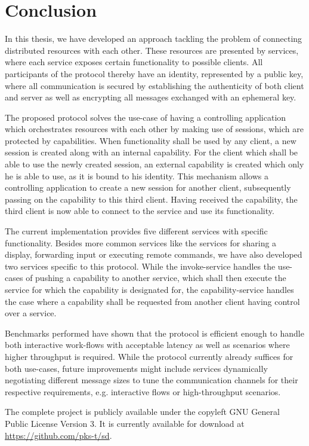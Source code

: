 \section{Conclusion}

In this thesis, we have developed an approach tackling the problem of connecting distributed resources with each other.
These resources are presented by services, where each service exposes certain functionality to possible clients.
All participants of the protocol thereby have an identity, represented by a public key, where all communication is secured by establishing the authenticity of both client and server as well as encrypting all messages exchanged with an ephemeral key.

The proposed protocol solves the use-case of having a controlling application which orchestrates resources with each other by making use of sessions, which are protected by capabilities.
When functionality shall be used by any client, a new session is created along with an internal capability.
For the client which shall be able to use the newly created session, an external capability is created which only he is able to use, as it is bound to his identity.
This mechanism allows a controlling application to create a new session for another client, subsequently passing on the capability to this third client.
Having received the capability, the third client is now able to connect to the service and use its functionality.

The current implementation provides five different services with specific functionality.
Besides more common services like the services for sharing a display, forwarding input or executing remote commands, we have also developed two services specific to this protocol.
While the invoke-service handles the use-cases of pushing a capability to another service, which shall then execute the service for which the capability is designated for, the capability-service handles the case where a capability shall be requested from another client having control over a service.

Benchmarks performed have shown that the protocol is efficient enough to handle both interactive work-flows with acceptable latency as well as scenarios where higher throughput is required.
While the protocol currently already suffices for both use-cases, future improvements might include services dynamically negotiating different message sizes to tune the communication channels for their respective requirements, e.g. interactive flows or high-throughput scenarios.

The complete project is publicly available under the copyleft GNU General Public License Version 3.
It is currently available for download at \url{https://github.com/pks-t/sd}.

